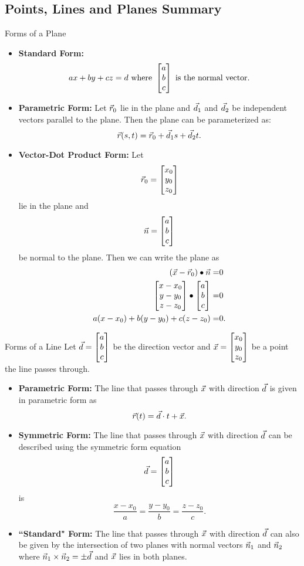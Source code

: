 \renewcommand\thesubsection{\thesection.\Alph{subsection}}
\setcounter{subsection}{18}
\subsection{Points, Lines and Planes Summary}
\begin{definition}{Forms of a Plane}
\begin{itemize}
\item \textbf{Standard Form:} $$ax+by+cz=d\text{ where }\begin{bmatrix}a\\b\\c\end{bmatrix}\text{ is the normal vector.} $$
\item \textbf{Parametric Form:} Let $\vec{r}_0$ lie in the plane and $\vec{d}_1$ and $\vec{d}_2$ be independent vectors parallel to the plane. Then the plane can be parameterized as:
$$\vec{r}(s,t)=\vec{r}_0+\vec{d}_1 s+\vec{d}_2 t.$$
\item \textbf{Vector-Dot Product Form:} Let $$\vec{r}_0=\begin{bmatrix}x_0\\y_0\\z_0\end{bmatrix}$$ lie in the plane and $$\vec{n}=\begin{bmatrix}a\\b\\c\end{bmatrix} $$ be normal to the plane. Then we can write the plane as
\begin{align*}
(\vec{x}-\vec{r}_0)\bullet \vec{n}=&0\\
\begin{bmatrix}x-x_0\\y-y_0\\z-z_0\end{bmatrix}\bullet\begin{bmatrix}a\\b\\c\end{bmatrix}=&0\\
a(x-x_0)+b(y-y_0)+c(z-z_0)=&0.
\end{align*}
\end{itemize}
\end{definition}

\begin{definition}{Forms of a Line}
Let $\vec{d}=\begin{bmatrix}a\\b\\c\end{bmatrix}$ be the direction vector and $\vec{x}=\begin{bmatrix}x_0\\y_0\\z_0\end{bmatrix}$ be a point the line passes through.
\begin{itemize}
\item \textbf{Parametric Form:} The line that passes through $\vec{x}$ with direction $\vec{d}$ is given in parametric form as $$\vec{r}(t)=\vec{d}\cdot t+\vec{x}. $$
\item \textbf{Symmetric Form:} The line that passes through $\vec{x}$ with direction $\vec{d}$ can be described using the symmetric form equation $$\vec{d}=\begin{bmatrix}a\\b\\c\end{bmatrix} $$ is $$\frac{x-x_0}{a}=\frac{y-y_0}{b}=\frac{z-z_0}{c}.$$
\item \textbf{``Standard" Form:} The line that passes through $\vec{x}$ with direction $\vec{d}$ can also be given by the intersection of two planes with normal vectors $\vec{n}_1$ and $\vec{n}_2$ where $\vec{n}_1\times\vec{n}_2=\pm\vec{d}$ and $\vec{x}$ lies in both planes.
\end{itemize}
\end{definition}


